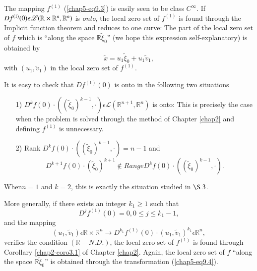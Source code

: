 The mapping $f^{(1)}$ (\ref{chap5-eq9.3}) is easily seen to be class
$C^{\infty}$. If $Df^{(1)} (0)\break \epsilon \mathscr{L} (\mathbb{R} \times
\mathbb{R}^{n}, \mathbb{R}^{n})$ is {\em onto}, the local zero set of
$f^{(1)}$ is found through the Implicit function theorem and reduces
to one curve: The part of the local zero set of $f$ which is ``along the
space $\mathbb{R} \widetilde{\xi}_{0}$'' (we hope this expression
self-explanatory) is obtained by
\begin{equation*}
\widetilde{x} = u_{1}\widetilde{\xi}_{0} +
u_{1}\widetilde{v}_{1},\tag{9.4}\label{chap5-eq9.4} 
\end{equation*}
with $(u_{1}, \widetilde{v}_{1})$ in the local zero set of $f^{(1)}$.

\begin{remark}\label{chap5-rem9.1}
It is easy to check that $Df^{(1)} (0)$ is onto in the following two
situations
\begin{enumerate}
\item[1)] $D^{k}f(0) \cdot ((\widetilde{\xi}_{0})^{k-1}, \cdot)
  \epsilon \mathscr{L} (\mathbb{R}^{n+1}, \mathbb{R}^{n})$ is onto:
  This is precisely the case when the problem is solved through the
  method of Chapter \ref{chap2} and defining $f^{(1)}$ is unnecessary.

\item[2)] Rank $D^{k}f(0) \cdot ((\widetilde{\xi}_{0})^{k-1}, \cdot) =
  n - 1$ and
$$
D^{k+1}f(0) \cdot (\widetilde{\xi}_{0})^{k+1} \notin Range D^{k}f(0)
\cdot ((\widetilde{\xi}_{0})^{k-1}, \cdot).
$$
\end{enumerate}

When\pageoriginale $n = 1$ and $k = 2$, tbis is exactly the situation
studied in $\S\ 3$.
\end{remark}

More generally, if there exists an integer $k_{1} \geq 1$ such that
\begin{equation*}
D^{j}f^{(1)}(0) = 0, 0 \leq j \leq k_{1} - 1,\tag{9.5}\label{chap5-eq9.5}
\end{equation*}
and the mapping
\begin{equation*}
(u_{1}, \widetilde{v}_{1}) \epsilon \mathbb{R} \times \mathbb{R}^{n}
  \to D^{k_{1}}f^{(1)} (0) \cdot (u_{1}, \widetilde{v}_{1})^{k_{1}}
  \epsilon \mathbb{R}^{n},\tag{9.6}\label{chap5-eq9.6}
\end{equation*}
verifies the condition $(\mathbb{R}-N.D.)$, the local zero set of
$f^{(1)}$ is found through Corollary \ref{chap2-coro3.1} of Chapter
\ref{chap2}. Again, the local zero set of $f$ ``along the space
$\mathbb{R} \widetilde{\xi}_{0}$'' is obtained through the
transformation (\ref{chap5-eq9.4}).

